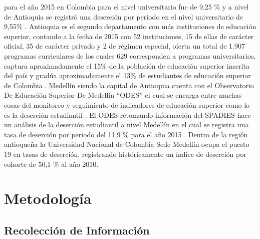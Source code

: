 \documentclass[]{article}
\begin{document}
para el año 2015 en Colombia para el nivel universitario fue de 9,25 \%
y a nivel de Antioquia se registró una deserción por periodo en el nivel
universitario de 9,55\% \citep{MinisteriodeEducacionNacional2016}.
Antioquia es el segundo departamento con más instituciones de educación
superior, contando a la fecha de 2015 con 52 instituciones, 15 de ellas
de carácter oficial, 35 de carácter privado y 2 de régimen especial,
oferta un total de 1.907 programas curriculares de los cuales 629
corresponden a programas universitarios, captura aproximadamente el 15\%
de la población de educación superior inscrita del país y gradúa
aproximadamente el 13\% de estudiantes de educación superior de Colombia
\citep{MinisteriodeEducacionNacional2016}. Medellín siendo la capital de
Antioquia cuenta con el Observatorio De Educación Superior De Medellín
``ODES'' el cual se encarga entre muchas cosas del monitoreo y
seguimiento de indicadores de educación superior como lo es la deserción
estudiantil \citep{AlcaldiadeMedellin2019}. El ODES retomando
información del SPADIES hace un análisis de la deserción estudiantil a
nivel Medellín en el cual se registra una tasa de deserción por periodo
del 11,9 \% para el año 2015 \citep{SPADIES2017}. Dentro de la región
antioqueña la Universidad Nacional de Colombia Sede Medellín ocupa el
puesto 19 en tasas de deserción, registrando históricamente un índice de
deserción por cohorte de 50,1 \% al año
2010\citep{UniversidadNacionaldeColombiaSedeMedellin.OficinadePlaneacion2011}.

\hypertarget{metodologia}{%
\section{Metodología}\label{metodologia}}

\hypertarget{recoleccion-de-informacion}{%
\subsection{Recolección de
Información}\label{recoleccion-de-informacion}}
\end{document}
